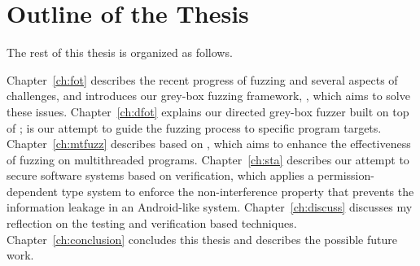 \section{Outline of the Thesis}

The rest of this thesis is organized as follows.

Chapter~\ref{ch:fot} describes the recent progress of fuzzing and several aspects of challenges, and introduces our grey-box fuzzing framework, \FOT, which aims to solve these issues. Chapter~\ref{ch:dfot} explains our directed grey-box fuzzer \dFOT built on top of \FOT; \dFOT is our attempt to guide the fuzzing process to specific program targets. Chapter~\ref{ch:mtfuzz} describes \mtfuzz based on \FOT, which aims to enhance the effectiveness of fuzzing on multithreaded programs. Chapter~\ref{ch:sta} describes our attempt to secure software systems based on verification, which applies a permission-dependent type system to enforce the non-interference property that prevents the information leakage in an Android-like system. Chapter~\ref{ch:discuss} discusses my reflection on the testing and verification based techniques. Chapter~\ref{ch:conclusion} concludes this thesis and describes the possible future work.